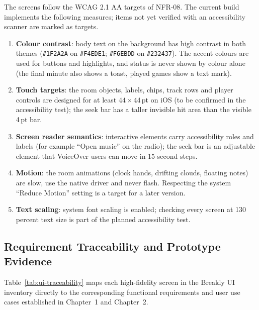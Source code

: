 The screens follow the WCAG 2.1 AA targets of NFR-08. The current build implements the following measures; items not yet verified with an accessibility scanner are marked as targets.
\begin{enumerate}[leftmargin=1.5em, itemsep=3pt]
  \item \textbf{Colour contrast}: body text on the background has high contrast in both themes (\texttt{\#1F2A2A} on \texttt{\#F4EDE1}; \texttt{\#F6EBDD} on \texttt{\#232437}). The accent colours are used for buttons and highlights, and status is never shown by colour alone (the final minute also shows a toast, played games show a text mark).
  \item \textbf{Touch targets}: the room objects, labels, chips, track rows and player controls are designed for at least $44 \times 44$\,pt on iOS (to be confirmed in the accessibility test); the seek bar has a taller invisible hit area than the visible 4\,pt bar.
  \item \textbf{Screen reader semantics}: interactive elements carry accessibility roles and labels (for example ``Open music'' on the radio); the seek bar is an adjustable element that VoiceOver users can move in 15-second steps.
  \item \textbf{Motion}: the room animations (clock hands, drifting clouds, floating notes) are slow, use the native driver and never flash. Respecting the system ``Reduce Motion'' setting is a target for a later version.
  \item \textbf{Text scaling}: system font scaling is enabled; checking every screen at 130 percent text size is part of the planned accessibility test.
\end{enumerate}

\subsection{Requirement Traceability and Prototype Evidence}
\label{sec:prototype-traceability}

Table~\ref{tab:ui-traceability} maps each high-fidelity screen in the Breakly UI inventory directly to the corresponding functional requirements and user use cases established in Chapter~1 and Chapter~2.

